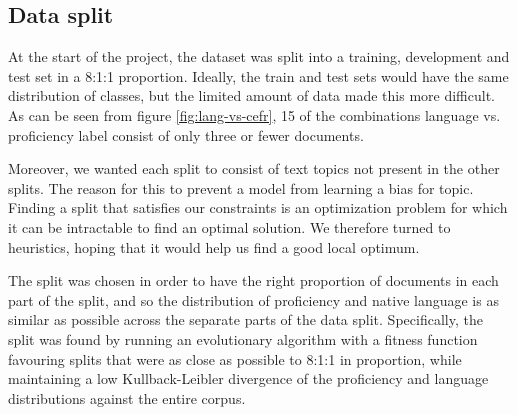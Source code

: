 \subsection{Data split}

At the start of the project, the dataset was split into a training,
development and test set in a 8:1:1 proportion. Ideally, the train and test
sets would have the same distribution of classes, but the limited amount of
data made this more difficult. As can be seen from figure \ref{fig:lang-vs-cefr},
15 of the combinations language vs. proficiency label consist of only three
or fewer documents.

Moreover, we wanted each split to consist of text topics not present in the
other splits. The reason for this to prevent a model from learning a bias for
topic. Finding a split that satisfies our constraints is an optimization
problem for which it can be intractable to find an optimal solution. We
therefore turned to heuristics, hoping that it would help us find a good
local optimum.
 
The split was chosen in order to have the right proportion of documents in
each part of the split, and so the distribution of proficiency and native
language is as similar as possible across the separate parts of the data
split. Specifically, the split was found by running an evolutionary algorithm
with a fitness function favouring splits that were as close as possible to
8:1:1 in proportion, while maintaining a low Kullback-Leibler divergence of
the proficiency and language distributions against the entire corpus.

